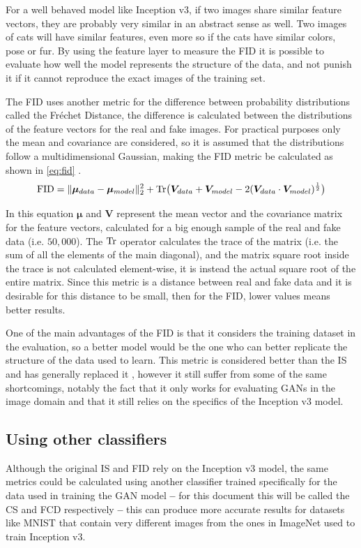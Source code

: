For a well behaved model like Inception v3, if two images share similar feature vectors, they are probably very similar in an abstract sense as well. Two images of cats will have similar features, even more so if the cats have similar colors, pose or fur. By using the feature layer to measure the \gls{FID} it is possible to evaluate how well the model represents the structure of the data, and not punish it if it cannot reproduce the exact images of the training set.

The \gls{FID} uses another metric for the difference between probability distributions called the Fréchet Distance, the difference is calculated between the distributions of the feature vectors for the real and fake images. For practical purposes only the mean and covariance are considered, so it is assumed that the distributions follow a multidimensional Gaussian, making the \gls{FID} metric be calculated as shown in \autoref{eq:fid} \cite{TTUR_FID2017}.
\begin{equation} \label{eq:fid}
    \operatorname{FID} = \|\bm{\mu}_{data} - \bm{\mu}_{model}\|_{2}^{2} + 
    \operatorname{Tr}\bigl(\bm{V}_{data} + \bm{V}_{model} - 2(\bm{V}_{data} \cdot \bm{V}_{model})^{\frac{1}{2}}\bigr)
\end{equation}

In this equation $\bm{\mu}$ and $\bm{V}$ represent the mean vector and the covariance matrix for the feature vectors, calculated for a big enough sample of the real and fake data (i.e. $50,000$). The $\operatorname{Tr}$ operator calculates the trace of the matrix (i.e. the sum of all the elements of the main diagonal), and the matrix square root inside the trace is not calculated element-wise, it is instead the actual square root of the entire matrix. Since this metric is a distance between real and fake data and it is desirable for this distance to be small, then for the \gls{FID}, lower values means better results.

One of the main advantages of the \gls{FID} is that it considers the training dataset in the evaluation, so a better model would be the one who can better replicate the structure of the data used to learn. This metric is considered better than the \gls{IS} and has generally replaced it \cite{coursera_IS}, however it still suffer from some of the same shortcomings, notably the fact that it only works for evaluating \acp{GAN} in the image domain and that it still relies on the specifics of the Inception v3 model.

\subsection{Using other classifiers}
Although the original \gls{IS} and \gls{FID} rely on the Inception v3 model, the same metrics could be calculated using another classifier trained specifically for the data used in training the \gls{GAN} model \textbf{--} for this document this will be called the \gls{CS} and \gls{FCD} respectively \textbf{--} this can produce more accurate results for datasets like \gls{MNIST} that contain very different images from the ones in ImageNet used to train Inception v3.

